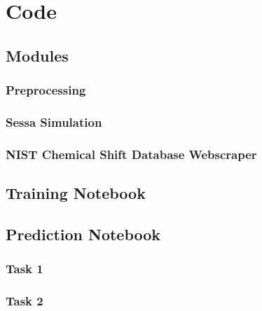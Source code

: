 

\chapter{Code} %

\label{AppendixA} %

\section{Modules}

\subsection{Preprocessing}
\label{preprocessing}


\subsection{Sessa Simulation}
\label{Sessa_Module}


\subsection{NIST Chemical Shift Database Webscraper}


\section{Training Notebook}

\section{Prediction Notebook}

\subsection{Task 1}

\subsection{Task 2}